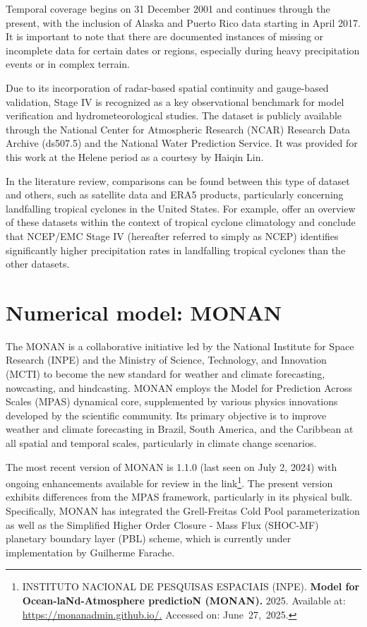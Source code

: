 Temporal coverage begins on 31 December 2001 and continues through the present, with the inclusion of Alaska and Puerto Rico data starting in April 2017. It is important to note that there are documented instances of missing or incomplete data for certain dates or regions, especially during heavy precipitation events or in complex terrain.

Due to its incorporation of radar-based spatial continuity and gauge-based validation, Stage IV is recognized as a key observational benchmark for model verification and hydrometeorological studies. The dataset is publicly available through the National Center for Atmospheric Research (NCAR) Research Data Archive (ds507.5) and the National Water Prediction Service. It was provided for this work at the Helene period as a courtesy by Haiqin Lin.

In the literature review, comparisons can be found between this type of dataset and others, such as satellite data and ERA5 products, particularly concerning landfalling tropical cyclones in the United States. For example,  offer an overview of these datasets within the context of tropical cyclone climatology and conclude that NCEP/EMC Stage IV (hereafter referred to simply as NCEP) identifies significantly higher precipitation rates in landfalling tropical cyclones than the other datasets.

\section{Numerical model: MONAN}

The MONAN is a collaborative initiative led by the National Institute for Space Research (INPE) and the Ministry of Science, Technology, and Innovation (MCTI) to become the new standard for weather and climate forecasting, nowcasting, and hindcasting. MONAN employs the Model for Prediction Across Scales (MPAS) dynamical core, supplemented by various physics innovations developed by the scientific community. Its primary objective is to improve weather and climate forecasting in Brazil, South America, and the Caribbean at all spatial and temporal scales, particularly in climate change scenarios.

The most recent version of MONAN is 1.1.0 (last seen on July 2, 2024) with ongoing enhancements available for review in the link\footnote{INSTITUTO NACIONAL DE PESQUISAS ESPACIAIS (INPE). \textbf{Model for Ocean-laNd-Atmosphere predictioN (MONAN).} 2025. Available at: \url{https://monanadmin.github.io/.}  Accessed on: June 27, 2025.}. The present version exhibits differences from the MPAS framework, particularly in its physical bulk. Specifically, MONAN has integrated the Grell-Freitas Cold Pool parameterization  as well as the Simplified Higher Order Closure - Mass Flux (SHOC-MF) planetary boundary layer (PBL) scheme, which is currently under implementation by Guilherme Farache.

